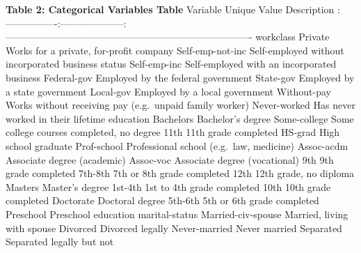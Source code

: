 \documentclass[
  letterpaper,
  DIV=11,
  numbers=noendperiod]{scrartcl}
\begin{document}
\textbf{Table 2: Categorical Variables Table} \textbar{} Variable
\textbar{} Unique Value \textbar{} Description \textbar{}
\textbar:----------------\textbar:--------------------\textbar:----------------------------------------------------------------------------\textbar{}
\textbar{} workclass \textbar{} Private \textbar{} Works for a private,
for-profit company \textbar{} \textbar{} \textbar{} Self-emp-not-inc
\textbar{} Self-employed without incorporated business status \textbar{}
\textbar{} \textbar{} Self-emp-inc \textbar{} Self-employed with an
incorporated business \textbar{} \textbar{} \textbar{} Federal-gov
\textbar{} Employed by the federal government \textbar{} \textbar{}
\textbar{} State-gov \textbar{} Employed by a state government
\textbar{} \textbar{} \textbar{} Local-gov \textbar{} Employed by a
local government \textbar{} \textbar{} \textbar{} Without-pay \textbar{}
Works without receiving pay (e.g.~unpaid family worker) \textbar{}
\textbar{} \textbar{} Never-worked \textbar{} Has never worked in their
lifetime \textbar{} \textbar{} education \textbar{} Bachelors \textbar{}
Bachelor's degree \textbar{} \textbar{} \textbar{} Some-college
\textbar{} Some college courses completed, no degree \textbar{}
\textbar{} \textbar{} 11th \textbar{} 11th grade completed \textbar{}
\textbar{} \textbar{} HS-grad \textbar{} High school graduate \textbar{}
\textbar{} \textbar{} Prof-school \textbar{} Professional school
(e.g.~law, medicine) \textbar{} \textbar{} \textbar{} Assoc-acdm
\textbar{} Associate degree (academic) \textbar{} \textbar{} \textbar{}
Assoc-voc \textbar{} Associate degree (vocational) \textbar{} \textbar{}
\textbar{} 9th \textbar{} 9th grade completed \textbar{} \textbar{}
\textbar{} 7th-8th \textbar{} 7th or 8th grade completed \textbar{}
\textbar{} \textbar{} 12th \textbar{} 12th grade, no diploma \textbar{}
\textbar{} \textbar{} Masters \textbar{} Master's degree \textbar{}
\textbar{} \textbar{} 1st-4th \textbar{} 1st to 4th grade completed
\textbar{} \textbar{} \textbar{} 10th \textbar{} 10th grade completed
\textbar{} \textbar{} \textbar{} Doctorate \textbar{} Doctoral degree
\textbar{} \textbar{} \textbar{} 5th-6th \textbar{} 5th or 6th grade
completed \textbar{} \textbar{} \textbar{} Preschool \textbar{}
Preschool education \textbar{} \textbar{} marital-status \textbar{}
Married-civ-spouse \textbar{} Married, living with spouse \textbar{}
\textbar{} \textbar{} Divorced \textbar{} Divorced legally \textbar{}
\textbar{} \textbar{} Never-married \textbar{} Never married \textbar{}
\textbar{} \textbar{} Separated \textbar{} Separated legally but not
\end{document}
